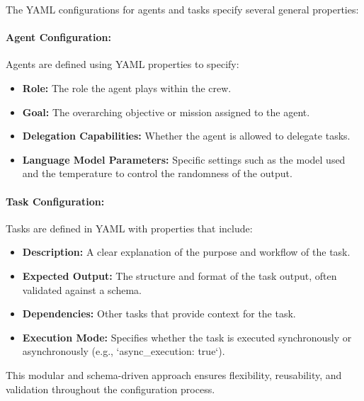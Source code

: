 The YAML configurations for agents and tasks specify several general properties:

\paragraph{Agent Configuration:} Agents are defined using YAML properties to specify:
\begin{itemize}
    \item \textbf{Role:} The role the agent plays within the crew.
    \item \textbf{Goal:} The overarching objective or mission assigned to the agent.
    \item \textbf{Delegation Capabilities:} Whether the agent is allowed to delegate tasks.
    \item \textbf{Language Model Parameters:} Specific settings such as the model used and the temperature to control the randomness of the output.
\end{itemize}

\paragraph{Task Configuration:} Tasks are defined in YAML with properties that include:
\begin{itemize}
    \item \textbf{Description:} A clear explanation of the purpose and workflow of the task.
    \item \textbf{Expected Output:} The structure and format of the task output, often validated against a schema.
    \item \textbf{Dependencies:} Other tasks that provide context for the task.
    \item \textbf{Execution Mode:} Specifies whether the task is executed synchronously or asynchronously (e.g., `async\_execution: true`).
\end{itemize}

This modular and schema-driven approach ensures flexibility, reusability, and validation throughout the configuration process.

